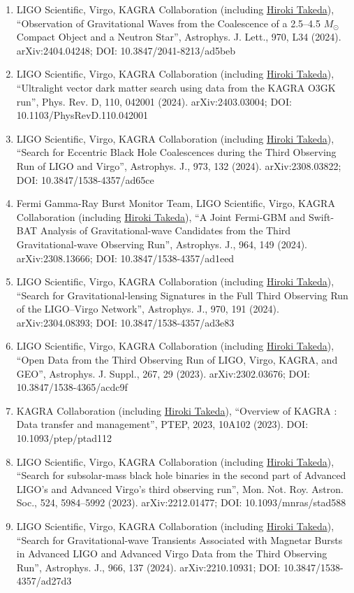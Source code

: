 \documentclass[uplatex, 11pt]{jsarticle}
\begin{document}
\begin{enumerate}
\item LIGO Scientific, Virgo, KAGRA Collaboration (including \uline{Hiroki Takeda}), “Observation of Gravitational Waves from the Coalescence of a 2.5--4.5 $M_{\odot}$ Compact Object and a Neutron Star”, Astrophys. J. Lett., 970, L34 (2024). arXiv:2404.04248; DOI: 10.3847/2041-8213/ad5beb
\item LIGO Scientific, Virgo, KAGRA Collaboration (including \uline{Hiroki Takeda}), “Ultralight vector dark matter search using data from the KAGRA O3GK run”, Phys. Rev. D, 110, 042001 (2024). arXiv:2403.03004; DOI: 10.1103/PhysRevD.110.042001
\item LIGO Scientific, Virgo, KAGRA Collaboration (including \uline{Hiroki Takeda}), “Search for Eccentric Black Hole Coalescences during the Third Observing Run of LIGO and Virgo”, Astrophys. J., 973, 132 (2024). arXiv:2308.03822; DOI: 10.3847/1538-4357/ad65ce
\item Fermi Gamma-Ray Burst Monitor Team, LIGO Scientific, Virgo, KAGRA Collaboration (including \uline{Hiroki Takeda}), “A Joint Fermi-GBM and Swift-BAT Analysis of Gravitational-wave Candidates from the Third Gravitational-wave Observing Run”, Astrophys. J., 964, 149 (2024). arXiv:2308.13666; DOI: 10.3847/1538-4357/ad1eed
\item LIGO Scientific, Virgo, KAGRA Collaboration (including \uline{Hiroki Takeda}), “Search for Gravitational-lensing Signatures in the Full Third Observing Run of the LIGO--Virgo Network”, Astrophys. J., 970, 191 (2024). arXiv:2304.08393; DOI: 10.3847/1538-4357/ad3e83
\item LIGO Scientific, Virgo, KAGRA Collaboration (including \uline{Hiroki Takeda}), “Open Data from the Third Observing Run of LIGO, Virgo, KAGRA, and GEO”, Astrophys. J. Suppl., 267, 29 (2023). arXiv:2302.03676; DOI: 10.3847/1538-4365/acdc9f
\item KAGRA Collaboration (including \uline{Hiroki Takeda}), “Overview of KAGRA : Data transfer and management”, PTEP, 2023, 10A102 (2023). DOI: 10.1093/ptep/ptad112
\item LIGO Scientific, Virgo, KAGRA Collaboration (including \uline{Hiroki Takeda}), “Search for subsolar-mass black hole binaries in the second part of Advanced LIGO's and Advanced Virgo's third observing run”, Mon. Not. Roy. Astron. Soc., 524, 5984--5992 (2023). arXiv:2212.01477; DOI: 10.1093/mnras/stad588
\item LIGO Scientific, Virgo, KAGRA Collaboration (including \uline{Hiroki Takeda}), “Search for Gravitational-wave Transients Associated with Magnetar Bursts in Advanced LIGO and Advanced Virgo Data from the Third Observing Run”, Astrophys. J., 966, 137 (2024). arXiv:2210.10931; DOI: 10.3847/1538-4357/ad27d3

\end{enumerate}
\end{document}
